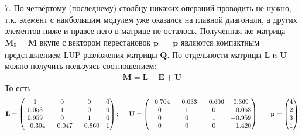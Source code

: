 7. По четвёртому (последнему) столбцу никаких операций проводить не нужно, т.к. элемент с наибольшим модулем уже оказался на главной диагонали, а других элементов ниже и правее него в матрице не осталось. Полученная же матрица $\mathbf{M}_5=\mathbf{M}$ вкупе с вектором перестановок $\mathbf{p}_1=\mathbf{p}$ являются компактным представлением LUP-разложения матрицы $\mathbf{Q}$. По-отдельности матрицы $\mathbf{L}$ и $\mathbf{U}$ можно получить пользуясь соотношением:
\begin{align}
    \mathbf{M} = \mathbf{L} - \mathbf{E} + \mathbf{U}
\end{align}
То есть:
\begin{align}
\mathbf{L} =
\begin{pmatrix}
    1    &  0    &  0    &  0\\
    0.053&  1    &  0    &  0\\
    0.959&  0    &  1    &  0\\
   -0.304& -0.047& -0.860&  1
\end{pmatrix}; \hspace{0.5cm}
\mathbf{U} =
\begin{pmatrix}
   -0.704& -0.033& -0.606&  0.369\\
    0    &  1    &  0    & -0.053\\
    0    &  0    &  1    & -0.959\\
    0    &  0    &  0    & -1.420
\end{pmatrix}; \hspace{0.5cm}
\mathbf{p} =
\begin{pmatrix}
    4 \\ 2 \\ 3 \\ 1
\end{pmatrix}
\end{align}


